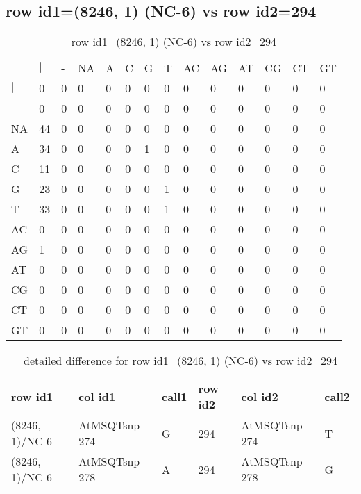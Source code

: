 \subsection{row id1=(8246, 1) (NC-6) vs row id2=294}
\begin{center}
\begin{longtable}{|l|l|l|l|l|l|l|l|l|l|l|l|l|l|}
\caption{row id1=(8246, 1) (NC-6) vs row id2=294} \label{table_dm188}\\
\hline
\\
\hline
&$|$&-&NA&A&C&G&T&AC&AG&AT&CG&CT&GT\\
$|$&0&0&0&0&0&0&0&0&0&0&0&0&0\\
-&0&0&0&0&0&0&0&0&0&0&0&0&0\\
NA&44&0&0&0&0&0&0&0&0&0&0&0&0\\
A&34&0&0&0&0&1&0&0&0&0&0&0&0\\
C&11&0&0&0&0&0&0&0&0&0&0&0&0\\
G&23&0&0&0&0&0&1&0&0&0&0&0&0\\
T&33&0&0&0&0&0&1&0&0&0&0&0&0\\
AC&0&0&0&0&0&0&0&0&0&0&0&0&0\\
AG&1&0&0&0&0&0&0&0&0&0&0&0&0\\
AT&0&0&0&0&0&0&0&0&0&0&0&0&0\\
CG&0&0&0&0&0&0&0&0&0&0&0&0&0\\
CT&0&0&0&0&0&0&0&0&0&0&0&0&0\\
GT&0&0&0&0&0&0&0&0&0&0&0&0&0\\
\hline
\end{longtable}
\end{center}

\begin{center}
\begin{longtable}{|l|l|l|l|l|l|}
\caption{detailed difference for row id1=(8246, 1) (NC-6) vs row id2=294} \label{table_dm189}\\
\hline
row id1&col id1&call1&row id2&col id2&call2\\
\hline
(8246, 1)/NC-6&AtMSQTsnp 274&G&294&AtMSQTsnp 274&T\\
(8246, 1)/NC-6&AtMSQTsnp 278&A&294&AtMSQTsnp 278&G\\
\hline
\end{longtable}
\end{center}

